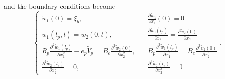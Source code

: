 \documentclass{elsarticle}
\begin{document}
and the boundary conditions become
\begin{equation}
    \left\{\begin{aligned}
        \tilde{w}_1(0) = \xi_b , &\quad \frac{\partial \tilde{w}_1}{\partial x_1} (0) = 0 \\
        w_1(l_p,t) = w_2(0,t), &\quad \frac{\partial \tilde{w}_1(l_p)}{\partial x_1} = \frac{\partial \tilde{w}_2(0)}{\partial x_2} \\
        B_p \frac{\partial^2 \tilde{w}_1(l_p)}{\partial x_1^2} - e_p \tilde{V}_p = B_e \frac{\partial^2 \tilde{w}_2(0)}{\partial x_2^2} , &\quad B_p \frac{\partial^3 \tilde{w}_1(l_p)}{\partial x_1^3} = B_e \frac{\partial^3 \tilde{w}_2(0)}{\partial x_2^3} \\
        \frac{\partial^2 \tilde{w}_2(l_e)}{\partial x_2^2} = 0 , &\quad \frac{\partial^3 \tilde{w}_2(l_e)}{\partial x_2^3} = 0
    \end{aligned}\right..
    \label{eq:eq_boundary_conditions_original}
\end{equation}
\end{document}
